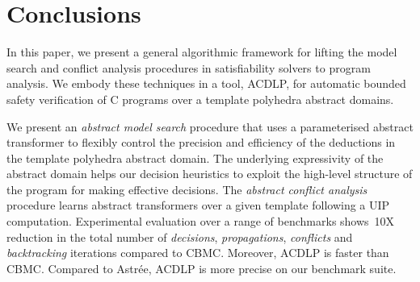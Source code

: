 \section{Conclusions}
In this paper, we present a general algorithmic framework for lifting 
the model search and conflict analysis procedures in satisfiability 
solvers to program analysis.  We embody these techniques in a tool, ACDLP,  
for automatic bounded safety verification of C programs over a template 
polyhedra abstract domains.  

We present an {\em abstract model search} procedure that uses a 
parameterised abstract transformer to flexibly control the precision and 
efficiency of the deductions in the template polyhedra abstract domain. 
The underlying expressivity of the abstract domain helps our decision 
heuristics to exploit the high-level structure of the program for making 
effective decisions.  The {\em abstract conflict analysis} procedure learns 
abstract transformers over a given template following a UIP computation.
Experimental evaluation over a range of benchmarks shows~10X
reduction in the total number of {\em decisions}, {\em propagations}, 
{\em conflicts} and {\em backtracking} iterations compared to CBMC.  Moreover, 
ACDLP is  faster than CBMC.  Compared to Astr{\'e}e, ACDLP is
 more precise on our benchmark suite.   


